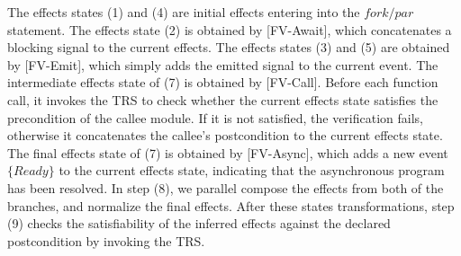 \documentclass[acmsmall,10pt,review]{acmart}
\newcommand{\code}[1]{{\tt{\ensuremath{\m{#1}}}}}
\newcommand{\m}{\mathit}
\begin{document}
The effects states (1) and (4) are initial effects entering into the \code{fork/par} statement. The effects state (2) is obtained by [FV-Await], which concatenates a blocking signal 
 to the current effects. 
The effects states (3) and (5) are obtained by [FV-Emit], which simply adds the emitted  signal to the current event. The intermediate effects state of (7) is obtained by [FV-Call]. 
Before each function call, it invokes the TRS to check whether the current effects state satisfies the precondition of the callee module. If it is not satisfied, the verification fails, otherwise it concatenates the callee's postcondition to the current effects state. The final effects state of (7) is obtained by [FV-Async], which adds a new event \code{\{Ready\}} to the current effects state, indicating that the asynchronous program has been resolved. 
In step (8), we parallel compose the effects from both of the branches, and normalize the final effects. 
After these states transformations, step (9) checks the satisfiability of the inferred effects against the declared postcondition by invoking the TRS.
\end{document}
